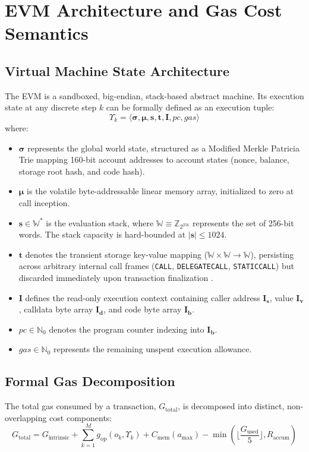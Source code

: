 \documentclass[conference]{IEEEtran}
\begin{document}
\section{EVM Architecture and Gas Cost Semantics}

\subsection{Virtual Machine State Architecture}
The EVM is a sandboxed, big-endian, stack-based abstract machine. Its execution state at any discrete step $k$ can be formally defined as an execution tuple:
\begin{equation}
\Upsilon_k = \langle \boldsymbol{\sigma}, \boldsymbol{\mu}, \mathbf{s}, \mathbf{t}, \mathbf{I}, pc, gas \rangle
\end{equation}
where:
\begin{itemize}
    \item $\boldsymbol{\sigma}$ represents the global world state, structured as a Modified Merkle Patricia Trie mapping 160-bit account addresses to account states (nonce, balance, storage root hash, and code hash).
    \item $\boldsymbol{\mu}$ is the volatile byte-addressable linear memory array, initialized to zero at call inception.
    \item $\mathbf{s} \in \mathbb{W}^*$ is the evaluation stack, where $\mathbb{W} \equiv \mathbb{Z}_{2^{256}}$ represents the set of 256-bit words. The stack capacity is hard-bounded at $|\mathbf{s}| \le 1024$.
    \item $\mathbf{t}$ denotes the transient storage key-value mapping ($\mathbb{W} \times \mathbb{W} \to \mathbb{W}$), persisting across arbitrary internal call frames (\texttt{CALL}, \texttt{DELEGATECALL}, \texttt{STATICCALL}) but discarded immediately upon transaction finalization \cite{eip1153}.
    \item $\mathbf{I}$ defines the read-only execution context containing caller address $\mathbf{I}_{\mathbf{s}}$, value $\mathbf{I}_{\mathbf{v}}$, calldata byte array $\mathbf{I}_{\mathbf{d}}$, and code byte array $\mathbf{I}_{\mathbf{b}}$.
    \item $pc \in \mathbb{N}_0$ denotes the program counter indexing into $\mathbf{I}_{\mathbf{b}}$.
    \item $gas \in \mathbb{N}_0$ represents the remaining unspent execution allowance.
\end{itemize}

\subsection{Formal Gas Decomposition}
The total gas consumed by a transaction, $G_{\text{total}}$, is decomposed into distinct, non-overlapping cost components:
\begin{equation}
G_{\text{total}} = G_{\text{intrinsic}} + \sum_{k=1}^{M} g_{\text{op}}(o_k, \Upsilon_k) + C_{\text{mem}}(a_{\text{max}}) - \min\left( \Big\lfloor \frac{G_{\text{used}}}{5} \Big\rfloor, R_{\text{accum}} \right)
\end{equation}
\end{document}
